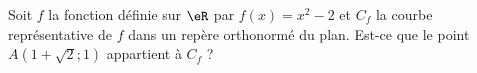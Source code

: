 
\begin{exercice}\label{exosmath-0650}

    Soit \( f\) la fonction définie sur \( \eR\) par \( f(x)=x^2-2\) et \( C_f\) la courbe représentative de \( f\) dans un repère orthonormé du plan. Est-ce que le point \( A(1+\sqrt{2};1)\) appartient à \( C_f\) ?

\end{exercice}
